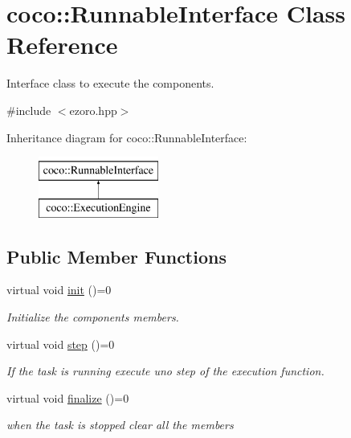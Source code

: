 \hypertarget{classcoco_1_1_runnable_interface}{\section{coco\-:\-:Runnable\-Interface Class Reference}
\label{classcoco_1_1_runnable_interface}
}


Interface class to execute the components.  




{\ttfamily \#include $<$ezoro.\-hpp$>$}

Inheritance diagram for coco\-:\-:Runnable\-Interface\-:\begin{figure}[H]
\begin{center}
\leavevmode
\includegraphics[height=2.000000cm]{classcoco_1_1_runnable_interface}
\end{center}
\end{figure}
\subsection*{Public Member Functions}
\begin{DoxyCompactItemize}
\item 
\hypertarget{classcoco_1_1_runnable_interface_aa104a540e574daa30a7b113150ccf0fb}{virtual void \hyperlink{classcoco_1_1_runnable_interface_aa104a540e574daa30a7b113150ccf0fb}{init} ()=0}\label{classcoco_1_1_runnable_interface_aa104a540e574daa30a7b113150ccf0fb}

\begin{DoxyCompactList}\small\item\em Initialize the components members. \end{DoxyCompactList}\item 
\hypertarget{classcoco_1_1_runnable_interface_a056e59ec3ee688ad7c35ebbf2c1a7d87}{virtual void \hyperlink{classcoco_1_1_runnable_interface_a056e59ec3ee688ad7c35ebbf2c1a7d87}{step} ()=0}\label{classcoco_1_1_runnable_interface_a056e59ec3ee688ad7c35ebbf2c1a7d87}

\begin{DoxyCompactList}\small\item\em If the task is running execute uno step of the execution function. \end{DoxyCompactList}\item 
\hypertarget{classcoco_1_1_runnable_interface_acbe1640138c6d48f23ba53c821663419}{virtual void \hyperlink{classcoco_1_1_runnable_interface_acbe1640138c6d48f23ba53c821663419}{finalize} ()=0}\label{classcoco_1_1_runnable_interface_acbe1640138c6d48f23ba53c821663419}

\begin{DoxyCompactList}\small\item\em when the task is stopped clear all the members \end{DoxyCompactList}\end{DoxyCompactItemize}
